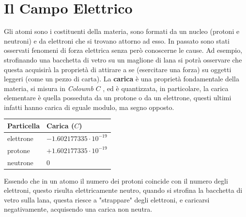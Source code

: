 \documentclass[10pt, letterpaper]{report}
\begin{document}
\chapter{Il Campo Elettrico}
Gli atomi sono i costituenti della materia, sono formati da un nucleo (protoni e neutroni) e da elettroni che si trovano attorno ad esso. In passato sono stati osservati fenomeni di forza elettrica senza però conoscerne le cause. Ad esempio, strofinando una bacchetta di vetro su un maglione di lana si potrà osservare che questa acquisirà la proprietà di attirare a se (esercitare una forza) su oggetti leggeri (come un pezzo di carta).\acc 
La \textbf{carica} è una proprietà fondamentale della materia, si misura in \textit{Coloumb} $C$ , ed è quantizzata, in particolare, la carica elementare è quella posseduta da un protone o da un elettrone, questi ultimi infatti hanno carica di eguale modulo, ma segno opposto.\begin{center}
    \begin{tabular}{|l|l|}
        \hline
        Particella & Carica ($C$)                \\ \hline
        elettrone  & $-1.602177335\cdot10^{-19}$ \\ \hline
        protone    & $+1.602177335\cdot10^{-19}$ \\ \hline
        neutrone   & 0                           \\ \hline
        \end{tabular}
\end{center}
Essendo che in un atomo il numero dei protoni coincide con il numero degli elettroni, questo risulta elettricamente neutro, quando si strofina la bacchetta di vetro sulla lana, questa riesce a "strappare" degli elettroni, e caricarsi negativamente, acquisendo una carica non neutra.
\end{document}
